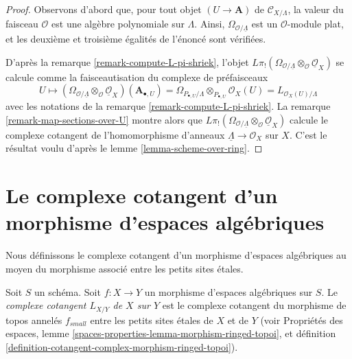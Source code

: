 \begin{proof}
Observons d'abord que, pour tout objet $(U \to \mathbf{A})$ de
$\mathcal{C}_{X/\Lambda}$, la valeur du faisceau $\mathcal{O}$ est une algèbre
polynomiale sur $\Lambda$. Ainsi,
$\Omega_{\mathcal{O}/\underline{\Lambda}}$ est un $\mathcal{O}$-module plat,
et les deuxième et troisième égalités de l'énoncé sont vérifiées.

\medskip\noindent
D'après la remarque \ref{remark-compute-L-pi-shriek}, l'objet
$L\pi_!(\Omega_{\mathcal{O}/\underline{\Lambda}}
\otimes_\mathcal{O} \underline{\mathcal{O}}_X)$
se calcule comme la faisceautisation du complexe de préfaisceaux
$$
U \mapsto
\left(\Omega_{\mathcal{O}/\underline{\Lambda}}
\otimes_\mathcal{O} \underline{\mathcal{O}}_X\right)(\mathbf{A}_{\bullet, U})
=
\Omega_{P_{\bullet, U}/\Lambda} \otimes_{P_{\bullet, U}} \mathcal{O}_X(U) =
L_{\mathcal{O}_X(U)/\Lambda}
$$
avec les notations de la remarque \ref{remark-compute-L-pi-shriek}. La remarque
\ref{remark-map-sections-over-U} montre alors que
$L\pi_!(\Omega_{\mathcal{O}/\underline{\Lambda}}
\otimes_\mathcal{O} \underline{\mathcal{O}}_X)$
calcule le complexe cotangent de l'homomorphisme d'anneaux
$\underline{\Lambda} \to \mathcal{O}_X$ sur $X$. C'est le résultat voulu
d'après le lemme \ref{lemma-scheme-over-ring}.
\end{proof}








\section{Le complexe cotangent d'un morphisme d'espaces algébriques}
\label{section-cotangent-morphism-spaces}

\noindent
Nous définissons le complexe cotangent d'un morphisme d'espaces algébriques au
moyen du morphisme associé entre les petits sites étales.

\begin{definition}
\label{definition-cotangent-morphism-spaces}
Soit $S$ un schéma. Soit $f : X \to Y$ un morphisme d'espaces algébriques sur
$S$. Le {\it complexe cotangent $L_{X/Y}$ de $X$ sur $Y$} est le complexe
cotangent du morphisme de topos annelés $f_{small}$ entre les petits sites
étales de $X$ et de $Y$ (voir Propriétés des espaces, lemme
\ref{spaces-properties-lemma-morphism-ringed-topoi}, et définition
\ref{definition-cotangent-complex-morphism-ringed-topoi}).
\end{definition}

